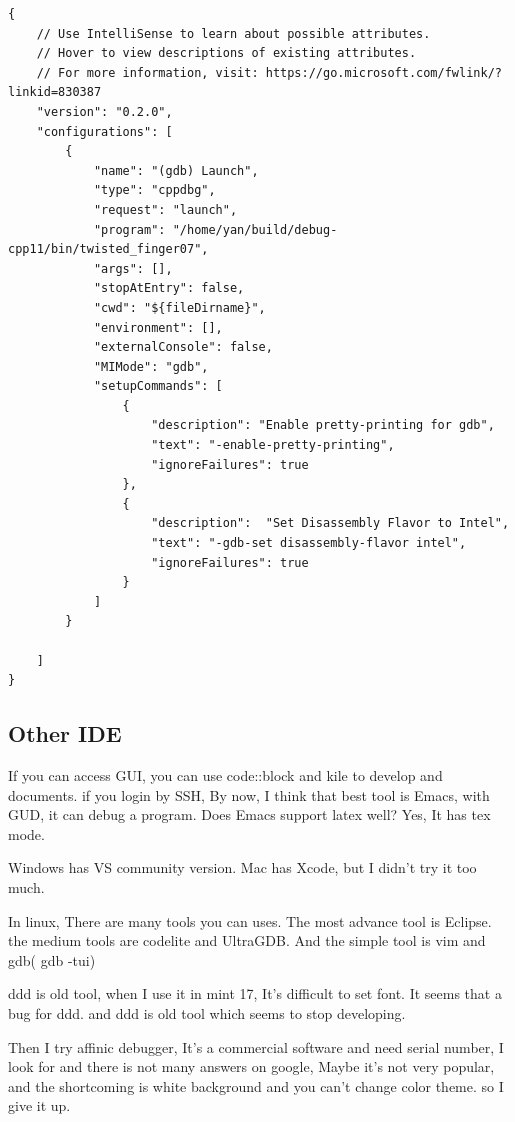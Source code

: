 \documentclass[paper=8.5in:11in, twoside, 12pt, pagesize=pdftex]{book}
\begin{document}
\begin{lstlisting}[mathescape=false]
{
    // Use IntelliSense to learn about possible attributes.
    // Hover to view descriptions of existing attributes.
    // For more information, visit: https://go.microsoft.com/fwlink/?linkid=830387
    "version": "0.2.0",
    "configurations": [
        {
            "name": "(gdb) Launch",
            "type": "cppdbg",
            "request": "launch",
            "program": "/home/yan/build/debug-cpp11/bin/twisted_finger07",
            "args": [],
            "stopAtEntry": false,
            "cwd": "${fileDirname}",
            "environment": [],
            "externalConsole": false,
            "MIMode": "gdb",
            "setupCommands": [
                {
                    "description": "Enable pretty-printing for gdb",
                    "text": "-enable-pretty-printing",
                    "ignoreFailures": true
                },
                {
                    "description":  "Set Disassembly Flavor to Intel",
                    "text": "-gdb-set disassembly-flavor intel",
                    "ignoreFailures": true
                }
            ]
        }

    ]
}
\end{lstlisting}

\ifdefined\autotools

\subsection{Other IDE}
If you can access GUI, you can use code::block and kile to develop and documents. if
you login by SSH, By now, I think that best tool is Emacs, with GUD, it can debug a
program. Does Emacs support latex well? Yes, It has tex mode. 

Windows has VS community version.  Mac has Xcode, but I didn't try it too much. 

In linux, There are many tools you can uses. The most advance tool is Eclipse. the medium tools are codelite and UltraGDB. And the simple tool is vim and gdb( gdb -tui) 

ddd is old tool, when I use it in mint 17, It's difficult to set font.  It seems that a bug for ddd. and ddd is old tool which seems to stop developing.  

Then I try affinic debugger, It's a commercial software and need serial number, I look for and there is not many answers on google, Maybe it's not very popular,  and the shortcoming is white background and you can't change color theme. so I give it up.
\end{document}
